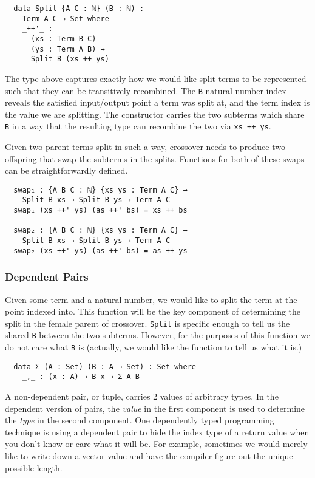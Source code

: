 \documentclass{acm_proc_article-sp}
\begin{document}
\begin{verbatim}
  data Split {A C : ℕ} (B : ℕ) :
    Term A C → Set where
    _++'_ :
      (xs : Term B C)
      (ys : Term A B) →
      Split B (xs ++ ys)
\end{verbatim}

The type above captures exactly how we would like split terms to be
represented such that they can be transitively recombined. The
\texttt{B} natural number index reveals the satisfied
input/output point a term was split at, and the term index is the
value we are splitting. The constructor carries the two
subterms which share \texttt{B} in a way that the resulting type can
recombine the two via \texttt{xs ++ ys}.

Given two parent terms split in such a way, crossover needs to produce
two offspring that swap the subterms in the splits. Functions for both
of these swaps can be straightforwardly defined.

\begin{verbatim}
  swap₁ : {A B C : ℕ} {xs ys : Term A C} →
    Split B xs → Split B ys → Term A C
  swap₁ (xs ++' ys) (as ++' bs) = xs ++ bs

  swap₂ : {A B C : ℕ} {xs ys : Term A C} →
    Split B xs → Split B ys → Term A C
  swap₂ (xs ++' ys) (as ++' bs) = as ++ ys
\end{verbatim}

\subsubsection{Dependent Pairs}

Given some term and a natural number, we would like to split the term
at the point indexed into. This function will be the key component of
determining the split in the female parent of
crossover. \texttt{Split} is specific enough to tell us the shared
\texttt{B} between the two subterms. However, for the purposes of this
function we do not care what \texttt{B} is (actually, we would like
the function to tell us what it is.)

\begin{verbatim}
  data Σ (A : Set) (B : A → Set) : Set where
    _,_ : (x : A) → B x → Σ A B
\end{verbatim}

A non-dependent pair, or tuple, carries 2 values of arbitrary
types. In the dependent version of pairs, the \textit{value} in the first
component is used to determine the \textit{type} in the second
component. One dependently typed programming technique is using a
dependent pair to hide the index type of a return value when you don't
know or care what it will be. For example, sometimes we would merely
like to write down a vector value and have the compiler figure out the
unique possible length.
\end{document}

